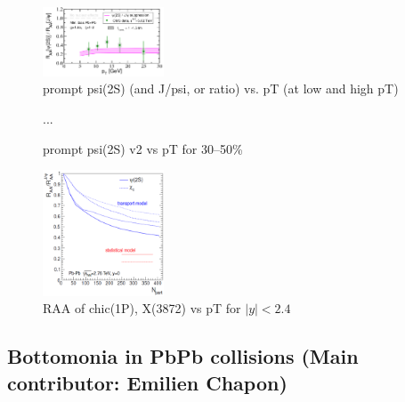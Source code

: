 \documentclass[../report.tex]{subfiles}
\begin{document}
\begin{figure}
\begin{center}
 \includegraphics[width=0.32\textwidth]{fig/theory/psi_dr_vitev.png}
\end{center}

 \caption{prompt psi(2S) (and J/psi, or ratio) vs. pT (at low and high pT) }
\end{figure}

\begin{figure}
...

 \caption{prompt psi(2S) v2 vs pT for 30--50\%}
\end{figure}

\begin{figure}
\begin{center}
 \includegraphics[width=0.32\textwidth]{fig/theory/chic.png}
\end{center}

 \caption{RAA of chic(1P), X(3872) vs pT for $|y|<2.4$}
\end{figure}

\clearpage

\subsection{Bottomonia in PbPb collisions (Main contributor: Emilien Chapon)}

\end{document}
